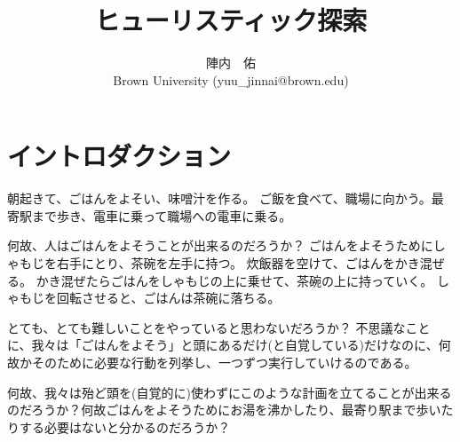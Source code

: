 \documentclass[10pt]{book}
\title{ヒューリスティック探索}
\author{陣内　佑 \\
Brown University (yuu\_jinnai@brown.edu)}
\begin{document}
\maketitle
\tableofcontents

\newpage

\chapter{イントロダクション}
\label{ch:introduction}

朝起きて、ごはんをよそい、味噌汁を作る。
ご飯を食べて、職場に向かう。最寄駅まで歩き、電車に乗って職場への電車に乗る。

何故、人はごはんをよそうことが出来るのだろうか？
ごはんをよそうためにしゃもじを右手にとり、茶碗を左手に持つ。
炊飯器を空けて、ごはんをかき混ぜる。
かき混ぜたらごはんをしゃもじの上に乗せて、茶碗の上に持っていく。
しゃもじを回転させると、ごはんは茶碗に落ちる。

とても、とても難しいことをやっていると思わないだろうか？
不思議なことに、我々は「ごはんをよそう」と頭にあるだけ(と自覚している)だけなのに、何故かそのために必要な行動を列挙し、一つずつ実行していけるのである。

何故、我々は殆ど頭を(自覚的に)使わずにこのような計画を立てることが出来るのだろうか？何故ごはんをよそうためにお湯を沸かしたり、最寄り駅まで歩いたりする必要はないと分かるのだろうか？
\end{document}
